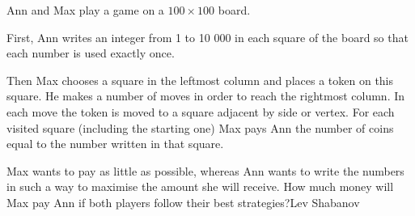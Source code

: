 Ann and Max play a game on a $100 \times 100$ board.

First, Ann writes an integer from 1 to 10 000 in each square of the board so that each number is used exactly once.

Then Max chooses a square in the leftmost column and places a token on this square. He makes a number of moves in order to reach the rightmost column. In each move the token is moved to a square adjacent by side or vertex. For each visited square (including the starting one) Max pays Ann the number of coins equal to the number written in that square.

Max wants to pay as little as possible, whereas Ann wants to write the numbers in such a way to maximise the amount she will receive. How much money will Max pay Ann if both players follow their best strategies?Lev Shabanov